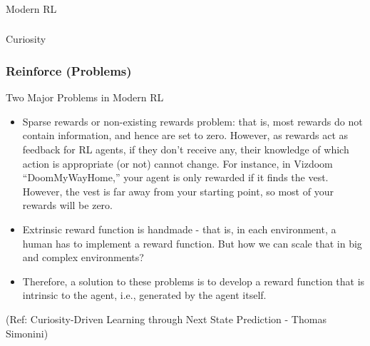 \begin{frame}[fragile]\frametitle{}
\begin{center}
{\Large Modern RL}
\end{center}
\end{frame}

\begin{frame}[fragile]\frametitle{}
\begin{center}
{\Large Curiosity}
\end{center}
\end{frame}

\begin{frame}[fragile]\frametitle{Reinforce (Problems)}

Two Major Problems in Modern RL

\begin{itemize}
\item Sparse rewards or non-existing rewards problem: that is, most rewards do not contain information, and hence are set to zero. However, as rewards act as feedback for RL agents, if they don't receive any, their knowledge of which action is appropriate (or not) cannot change. For instance, in Vizdoom ``DoomMyWayHome,'' your agent is only rewarded if it finds the vest. However, the vest is far away from your starting point, so most of your rewards will be zero.
\item Extrinsic reward function is handmade - that is, in each environment, a human has to implement a reward function. But how we can scale that in big and complex environments?
\item Therefore, a solution to these problems is to develop a reward function that is intrinsic to the agent, i.e., generated by the agent itself. 
\end{itemize}

{\tiny (Ref: Curiosity-Driven Learning through Next State Prediction - Thomas Simonini)}

\end{frame}

